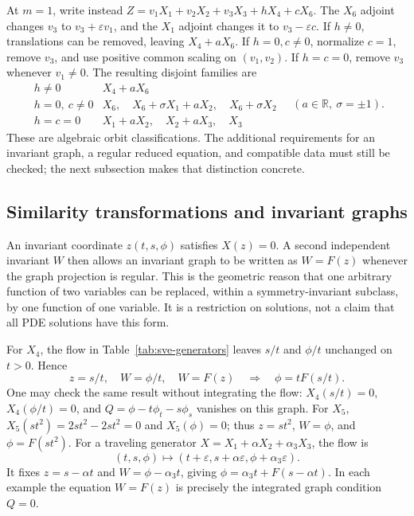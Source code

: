 At $m=1$, write instead $Z=v_1X_1+v_2X_2+v_3X_3+hX_4+cX_6$.
The $X_6$ adjoint changes $v_3$ to $v_3+\varepsilon v_1$, and the
$X_1$ adjoint changes it to $v_3-\varepsilon c$. If $h\ne0$,
translations can be removed, leaving $X_4+aX_6$. If $h=0,c\ne0$,
normalize $c=1$, remove $v_3$, and use positive common scaling on
$(v_1,v_2)$. If $h=c=0$, remove $v_3$ whenever $v_1\ne0$.
The resulting disjoint families are
\[
 \begin{array}{c|l}
 h\ne0 & X_4+aX_6\\
 h=0,\ c\ne0 & X_6,\quad X_6+\sigma X_1+aX_2,\quad X_6+\sigma X_2\\
 h=c=0 & X_1+aX_2,\quad X_2+aX_3,\quad X_3
 \end{array}
 \quad(a\in\mathbb R,\ \sigma=\pm1).
\]
These are algebraic orbit classifications. The additional requirements
for an invariant graph, a regular reduced equation, and compatible data
must still be checked; the next subsection makes that distinction concrete.

\subsection{Similarity transformations and invariant graphs}
An invariant coordinate $z(t,s,\phi)$ satisfies $X(z)=0$. A second
independent invariant $W$ then allows an invariant graph to be written
as $W=F(z)$ whenever the graph projection is regular. This is the
geometric reason that one arbitrary function of two variables can be
replaced, within a symmetry-invariant subclass, by one function of one
variable. It is a restriction on solutions, not a claim that all PDE
solutions have this form.

For $X_4$, the flow in Table~\ref{tab:sve-generators} leaves $s/t$ and
$\phi/t$ unchanged on $t>0$. Hence
\[
 z=s/t,\quad W=\phi/t,\quad W=F(z)
 \quad\Longrightarrow\quad \phi=tF(s/t).
\]
One may check the same result without integrating the flow:
$X_4(s/t)=0$, $X_4(\phi/t)=0$, and
$Q=\phi-t\phi_t-s\phi_s$ vanishes on this graph.
For $X_5$, $X_5(st^2)=2st^2-2st^2=0$ and $X_5(\phi)=0$;
thus $z=st^2$, $W=\phi$, and $\phi=F(st^2)$.
For a traveling generator
$X=X_1+\alpha X_2+\alpha_3X_3$, the flow is
\[
 (t,s,\phi)\longmapsto
 (t+\varepsilon,s+\alpha\varepsilon,\phi+\alpha_3\varepsilon).
\]
It fixes $z=s-\alpha t$ and $W=\phi-\alpha_3t$, giving
$\phi=\alpha_3t+F(s-\alpha t)$. In each example the equation
$W=F(z)$ is precisely the integrated graph condition $Q=0$.

